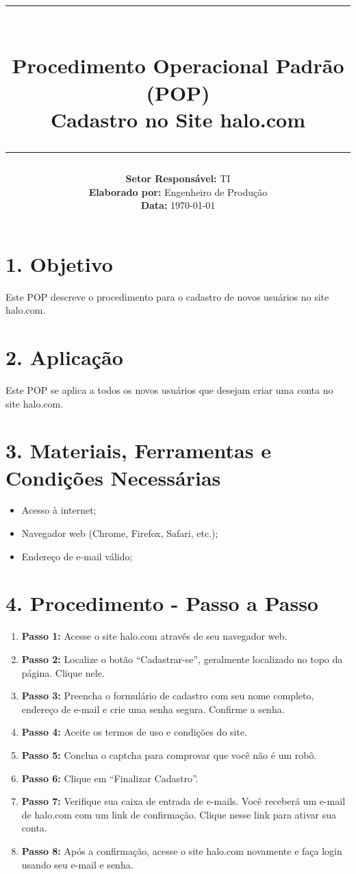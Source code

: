 \documentclass[a4paper,12pt]{article}
\title{
    \vspace{-2cm}
    \rule{\linewidth}{0.5mm}\\[0.4cm]
    \textbf{Procedimento Operacional Padrão (POP)}\\[0.2cm]
    \textbf{Cadastro no Site halo.com}\\[0.2cm]
    \rule{\linewidth}{0.5mm}
}
\author{
    \textbf{Setor Responsável:} TI \\
    \textbf{Elaborado por:} Engenheiro de Produção \\
    \textbf{Data:} \today
}
\date{}
\begin{document}
\maketitle
\vspace{-1cm}

\section*{1. Objetivo}
Este POP descreve o procedimento para o cadastro de novos usuários no site halo.com.

\section*{2. Aplicação}
Este POP se aplica a todos os novos usuários que desejam criar uma conta no site halo.com.

\section*{3. Materiais, Ferramentas e Condições Necessárias}
\begin{itemize}
    \item Acesso à internet;
    \item Navegador web (Chrome, Firefox, Safari, etc.);
    \item Endereço de e-mail válido;
\end{itemize}

\section*{4. Procedimento - Passo a Passo}
\begin{enumerate}
    \item \textbf{Passo 1:} Acesse o site halo.com através de seu navegador web.
    \item \textbf{Passo 2:} Localize o botão “Cadastrar-se”, geralmente localizado no topo da página. Clique nele.
    \item \textbf{Passo 3:} Preencha o formulário de cadastro com seu nome completo, endereço de e-mail e crie uma senha segura. Confirme a senha.
    \item \textbf{Passo 4:} Aceite os termos de uso e condições do site.
    \item \textbf{Passo 5:} Conclua o captcha para comprovar que você não é um robô.
    \item \textbf{Passo 6:} Clique em “Finalizar Cadastro”.
    \item \textbf{Passo 7:} Verifique sua caixa de entrada de e-mails. Você receberá um e-mail de halo.com com um link de confirmação. Clique nesse link para ativar sua conta.
    \item \textbf{Passo 8:} Após a confirmação, acesse o site halo.com novamente e faça login usando seu e-mail e senha.
\end{enumerate}
\end{document}
